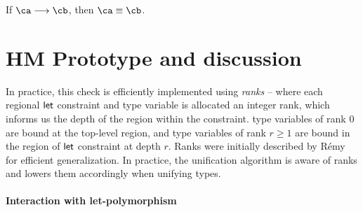 \documentclass[acmsmall,screen,nonacm]{acmart}
\begin{document}
\begin{theorem}[Preservation]
  If $\ca \csolve \cb$, then $\ca \cequiv \cb$.
\end{theorem}



\section{HM Prototype and discussion}
\label{sec:implementation}


In practice, this
check is efficiently implemented using \emph{ranks} -- where each regional
$\mathopen{}\mathrel{\mathsf{let}}$ constraint and type variable is allocated an integer rank, which
informs us the depth of the region within the constraint. type variables of
rank $0$ are bound at the top-level region, and type variables of rank $r \geq
1$ are bound in the region of $\mathopen{}\mathrel{\mathsf{let}}$ constraint at depth $r$. Ranks were
initially described by R\'emy \cite{TODO} for efficient generalization.
In practice, the unification algorithm is aware of ranks and lowers them
accordingly when unifying types.





\paragraph{Interaction with let-polymorphism}
\end{document}
